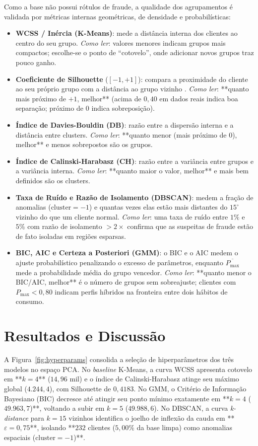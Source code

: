 \documentclass[10pt,twocolumn]{article}
\begin{document}
Como a base não possui rótulos de fraude, a qualidade dos agrupamentos é validada por métricas internas geométricas, de densidade e probabilísticas:
\begin{itemize}
  \item \textbf{WCSS / Inércia (K-Means)}: mede a distância interna dos clientes ao centro do seu grupo. \textit{Como ler}: valores menores indicam grupos mais compactos; escolhe-se o ponto de ``cotovelo'', onde adicionar novos grupos traz pouco ganho.
  \item \textbf{Coeficiente de Silhouette} ($[-1, +1]$): compara a proximidade do cliente ao seu próprio grupo com a distância ao grupo vizinho \cite{rousseeuw1987}. \textit{Como ler}: **quanto mais próximo de $+1$, melhor** (acima de $0,40$ em dados reais indica boa separação; próximo de $0$ indica sobreposição).
  \item \textbf{Índice de Davies-Bouldin (DB)}: razão entre a dispersão interna e a distância entre clusters. \textit{Como ler}: **quanto menor (mais próximo de $0$), melhor** e menos sobrepostos são os grupos.
  \item \textbf{Índice de Calinski-Harabasz (CH)}: razão entre a variância entre grupos e a variância interna. \textit{Como ler}: **quanto maior o valor, melhor** e mais bem definidos são os clusters.
  \item \textbf{Taxa de Ruído e Razão de Isolamento (DBSCAN)}: medem a fração de anomalias ($\text{cluster} = -1$) e quantas vezes elas estão mais distantes do $15^\circ$ vizinho do que um cliente normal. \textit{Como ler}: uma taxa de ruído entre $1\%$ e $5\%$ com razão de isolamento $> 2\times$ confirma que as suspeitas de fraude estão de fato isoladas em regiões esparsas.
  \item \textbf{BIC, AIC e Certeza a Posteriori (GMM)}: o BIC e o AIC medem o ajuste probabilístico penalizando o excesso de parâmetros, enquanto $\overline{P_{\max}}$ mede a probabilidade média do grupo vencedor. \textit{Como ler}: **quanto menor o BIC/AIC, melhor** é o número de grupos sem sobreajuste; clientes com $P_{\max} < 0,80$ indicam perfis híbridos na fronteira entre dois hábitos de consumo.
\end{itemize}

\section{Resultados e Discussão}

A Figura~\ref{fig:hyperparams} consolida a seleção de hiperparâmetros dos três modelos no espaço PCA. No \textit{baseline} K-Means, a curva WCSS apresenta cotovelo em **$k = 4$** ($14,96$ mil) e o índice de Calinski-Harabasz atinge seu máximo global ($4.244,4$), com Silhouette de $0,4183$. No GMM, o Critério de Informação Bayesiano (BIC) decresce até atingir seu ponto mínimo exatamente em **$k = 4$ ($49.963,7$)**, voltando a subir em $k = 5$ ($49.988,6$). No DBSCAN, a curva \textit{k-distance} para $k = 15$ vizinhos identifica o joelho de inflexão da cauda em **$\varepsilon = 0,75$**, isolando **$232$ clientes ($5,00\%$ da base limpa) como anomalias espaciais ($\text{cluster} = -1$)**.
\end{document}
